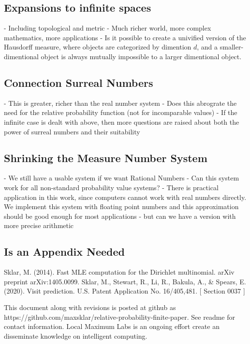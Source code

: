 \documentclass[twoside]{article}
\begin{document}
\subsection{Expansions to infinite spaces}
- Including topological and metric
- Much richer world, more complex mathematics, more applications
- Is it possible to create a univified version of the Hausdorff measure, where objects are categorized by dimention \(d\), and a smaller-dimentional object is always mutually impossible to a larger dimentional object.
\subsection{Connection Surreal Numbers}
- This is greater, richer than the real number system
- Does this abrograte the need for the relative probability function (not for incomparable values)
- If the infinite case is dealt with above, then more questions are raised about both the power of surreal numbers and their suitability
\subsection{Shrinking the Measure Number System}
- We still have a usable system if we want Rational Numbers
- Can this system work for all non-standard probability value systems?
- There is practical application in this work, since computers cannot work with real numbers directly. We implement this system with floating point numbers and this approximation should be good enough for most applications - but can we have a version with more precise arithmetic

\begin{appendices}

\section{Is an Appendix Needed}

\end{appendices}


\begin{thebibliography}{20}

Sklar, M. (2014). Fast MLE computation for the Dirichlet multinomial. arXiv preprint arXiv:1405.0099.
Sklar, M., Stewart, R., Li, R., Bakula, A., \& Spears, E. (2020). Visit prediction. U.S. Patent Application No. 16/405,481. [ Section 0037 ]

\end{thebibliography}

This document along with revisions is posted at github as https://github.com/maxsklar/relative-probability-finite-paper. See readme for contact information. Local Maximum Labs is an ongoing effort create an disseminate knowledge on intelligent computing.
\end{document}
